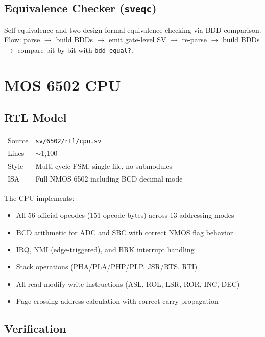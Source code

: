 \documentclass[11pt]{article}
\begin{document}
\subsection{Equivalence Checker (\texttt{sveqc})}

Self-equivalence and two-design formal equivalence checking via BDD
comparison.  Flow: parse $\to$ build BDDs $\to$ emit gate-level SV
$\to$ re-parse $\to$ build BDDs $\to$ compare bit-by-bit with
\texttt{bdd-equal?}.

\section{MOS 6502 CPU}

\subsection{RTL Model}

\begin{tabular}{@{}ll@{}}
\toprule
Source & \texttt{sv/6502/rtl/cpu.sv} \\
Lines  & $\sim$1,100 \\
Style  & Multi-cycle FSM, single-file, no submodules \\
ISA    & Full NMOS 6502 including BCD decimal mode \\
\bottomrule
\end{tabular}

\medskip\noindent
The CPU implements:
\begin{itemize}[nosep]
\item All 56 official opcodes (151 opcode bytes) across 13 addressing modes
\item BCD arithmetic for ADC and SBC with correct NMOS flag behavior
\item IRQ, NMI (edge-triggered), and BRK interrupt handling
\item Stack operations (PHA/PLA/PHP/PLP, JSR/RTS, RTI)
\item All read-modify-write instructions (ASL, ROL, LSR, ROR, INC, DEC)
\item Page-crossing address calculation with correct carry propagation
\end{itemize}

\subsection{Verification}
\end{document}
